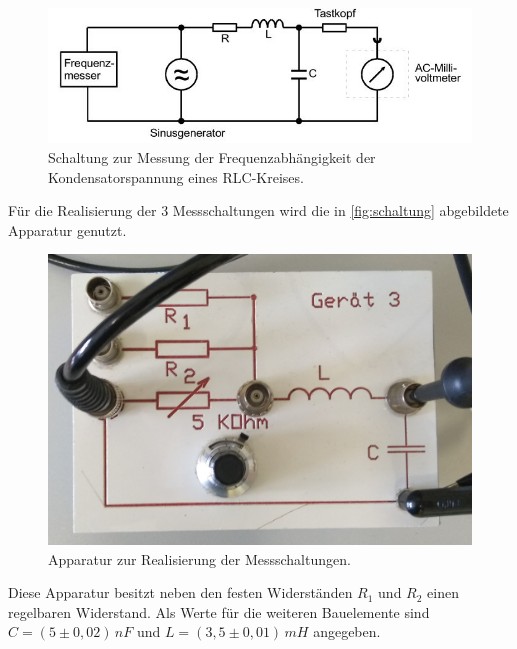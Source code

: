 \begin{figure}[H]
    \centering
    \includegraphics[width=\textwidth]{bilder/aufbauc.JPG}
    \caption{Schaltung zur Messung der Frequenzabhängigkeit der Kondensatorspannung eines RLC-Kreises. \cite{sample}}
    \label{fig:aufbauc}
  \end{figure}
\noindent
Für die Realisierung der 3 Messschaltungen wird die in \autoref{fig:schaltung} abgebildete Apparatur genutzt.
\begin{figure}[H]
    \centering
    \includegraphics[width=\textwidth]{bilder/schaltung.jpg}
    \caption{Apparatur zur Realisierung der Messschaltungen.}
    \label{fig:schaltung}
  \end{figure}
\noindent
Diese Apparatur besitzt neben den festen Widerständen $R_1$ und $R_2$ einen regelbaren
Widerstand. Als Werte für die weiteren Bauelemente sind $C=(5\pm0,02) \,\si{nF}$ und
$L=(3,5\pm0,01) \,\si{mH}$ angegeben.  

